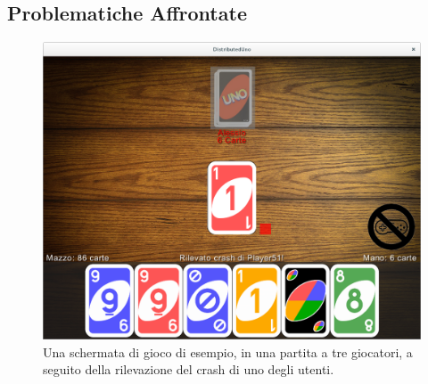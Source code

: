 \documentclass[11pt]{article} %
\begin{document}
\subsection{Problematiche Affrontate}

\begin{figure}[h]
\centering%
\includegraphics[width=12cm, keepaspectratio]{gameScreen2.png}%
\caption{Una schermata di gioco di esempio, in una partita a tre giocatori, a seguito della rilevazione del crash di uno degli utenti.}
\end{figure}
\end{document}
